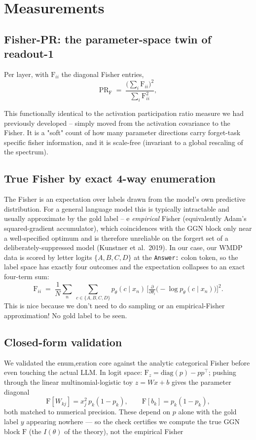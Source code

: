 \documentclass[11pt]{article}
\newcommand{\Fisher}{\ensuremath{\mathrm{F}}}
\begin{document}
\section{Measurements}

\subsection{Fisher-PR: the parameter-space twin of readout-1}
Per layer, with $\Fisher_{ii}$ the diagonal Fisher entries,
\begin{equation}
  \mathrm{PR}_{\Fisher} \;=\; \frac{\big(\sum_i \Fisher_{ii}\big)^2}{\sum_i \Fisher_{ii}^2},
\end{equation}

This functionally identical to the activation participation ratio measure we had previously developed -- simply moved from the activation covariance to the Fisher. It is a "soft" count of how many parameter directions carry forget-task specific fisher information, and it is scale-free (invariant to a global rescaling of the spectrum).

\subsection{True Fisher by exact 4-way enumeration}
The Fisher is an expectation over labels drawn from the model's own predictive distribution. For a general language model this is typically intractable and usually approximate by the gold label -- e
\emph{empirical} Fisher (equivalently Adam's squared-gradient accumulator), which coincidences with the GGN block only near a well-specified optimum and is therefore unreliable on the forgert set of a deliberately-suppressed model (Kunstner et al.\ 2019). In our case, our WMDP data is scored by letter logits $\{A,B,C,D\}$ at the \texttt{Answer:} colon token, so the label space has exactly four outcomes and the expectation collapses to an exact four-term sum: 
\begin{equation}
  \Fisher_{ii} \;=\; \frac{1}{N}\sum_{n}\ \sum_{c\in\{A,B,C,D\}}
     p_\theta(c\mid x_n)\,\Big[\tfrac{\partial}{\partial \theta_i}\big(-\log p_\theta(c\mid x_n)\big)\Big]^2 .
\end{equation}
This is nice because we don't need to do sampling or an empirical-Fisher approximation! No gold label to be seen. 

\subsection{Closed-form validation }
We validated the enum,eration core against the analytic categorical Fisher before even touching the actual LLM. In logit space:
$\Fisher_z = \mathrm{diag}(p) - p p^\top$; pushing through the linear
multinomial-logistic toy $z = Wx+b$ gives the parameter diagonal
\begin{equation}
  \Fisher[W_{kj}] = x_j^2\, p_k(1-p_k), \qquad \Fisher[b_k] = p_k(1-p_k),
\end{equation}
both matched to numerical precision. These depend on  $p$ alone with the gold
label $y$ appearing nowhere --- so the check certifies we compute the true GGN block $\Fisher$
(the $I(\theta)$ of the theory), not the empirical Fisher
\end{document}
